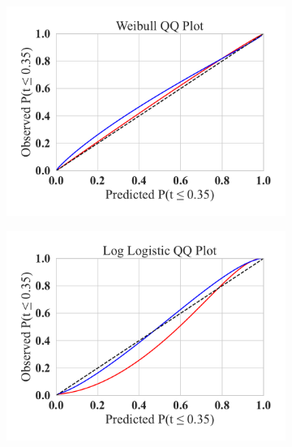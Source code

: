 \documentclass[conference]{IEEEtran}
\begin{document}
{\begin{figure}[h!]
    \centering
    \captionsetup[subfigure]{skip=0pt} %
    \begin{subfigure}[b]{.3\linewidth}
        \centering
        \includegraphics[width=\linewidth,clip]{plots/combined/weibull_qq.pdf}
        \caption{}
    \end{subfigure}
    \begin{subfigure}[b]{.3\linewidth}
        \centering
        \includegraphics[width=\linewidth,clip]{plots/combined/log_logistic_qq.pdf}
        \caption{ }
    \end{subfigure}
    \begin{subfigure}[b]{.3\linewidth}
        \centering

\end{subfigure}
\end{figure}}
\end{document}
